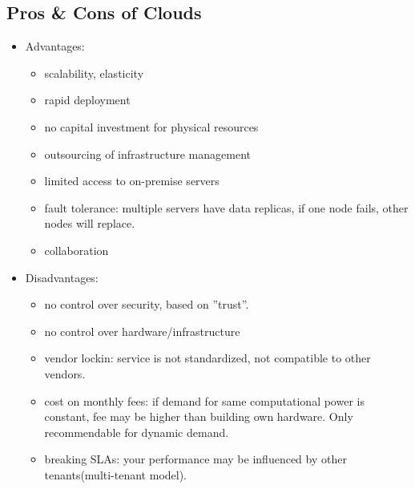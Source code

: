 \subsection{Pros \& Cons of Clouds}
\begin{itemize}
	\item Advantages:

\begin{itemize}
	\item scalability, elasticity
	\item rapid deployment
	\item no capital investment for physical resources
	\item outsourcing of infrastructure management
	\item limited access to on-premise servers
	\item fault tolerance: multiple servers have data replicas, if one node fails, other nodes will replace.
	\item collaboration
\end{itemize}
	\item Disadvantages:
	\begin{itemize}
		\item no control over security, based on ''trust''.
		\item no control over hardware/infrastructure
		\item vendor lockin: service is not standardized, not compatible to other vendors.
		\item cost on monthly fees: if demand for same computational power is constant, fee may be higher than building own hardware. Only recommendable for dynamic demand.
		\item breaking SLAs: your performance may be influenced by other tenants(multi-tenant model).
	\end{itemize}
\end{itemize}